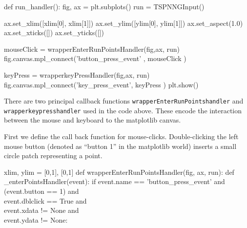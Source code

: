 \nwenddocs{}\endmoddef\nwstartdeflinemarkup{}\nwenddeflinemarkup
def run_handler():
    fig, ax =  plt.subplots()
    run = TSPNNGInput()
    
    ax.set_xlim([xlim[0], xlim[1]])
    ax.set_ylim([ylim[0], ylim[1]])
    ax.set_aspect(1.0)
    ax.set_xticks([])
    ax.set_yticks([])
      
    mouseClick   = wrapperEnterRunPointsHandler(fig,ax, run)
    fig.canvas.mpl_connect('button_press_event' , mouseClick )
      
    keyPress     = wrapperkeyPressHandler(fig,ax, run)
    fig.canvas.mpl_connect('key_press_event', keyPress   )
    plt.show()
\nwendcode{}\nwdocspar



There are two principal callback functions \verb|wrapperEnterRunPointshandler| and \verb|wrapperkeypresshandler| used in the code above. 
These encode the interaction between the mouse and keyboard to the matplotlib canvas. 

First we define the call back function for mouse-clicks. Double-clicking the left mouse button (denoted as ``button 1'' in the matplotlib world)
inserts a small circle patch representing a point. 

\nwenddocs{}\plusendmoddef\nwstartdeflinemarkup{}\nwenddeflinemarkup
xlim, ylim = [0,1], [0,1]
def wrapperEnterRunPointsHandler(fig, ax, run):
    def _enterPointsHandler(event):
        if event.name      == 'button_press_event'     and \\
           (event.button   == 1)                       and \\
            event.dblclick == True                     and \\ 
            event.xdata  != None                       and\\ 
            event.ydata  != None:


